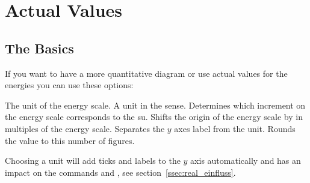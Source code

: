 \documentclass[load-preamble+]{cnltx-doc}
\begin{document}
\begin{example}
  \begin{endiagram}[y-label=above]
  \end{endiagram}
  \begin{endiagram}[y-label=above,x-label=right]
  \end{endiagram}
  \begin{endiagram}[axes=all,y-label=above]
  \end{endiagram}
\end{example}

\section{Actual Values}\label{sec:reale_werte}
\subsection{The Basics}

If you want to have a more quantitative diagram or use actual values for the
energies you can use these options:
\begin{options}
  \Default
    The unit of the energy scale.  A unit in the  sense.
    Determines which increment on the energy scale corresponds to the
    \ac{su}.
    Shifts the origin of the energy scale by  in multiples of the
    energy scale.
  \Default{/}
    Separates the $y$ axes label from the unit.
    Rounds the value to this number of figures.
\end{options}
Choosing a unit will add ticks and labels to the $y$ axis automatically and has
an impact on the commands  and , see
section~\ref{ssec:real_einfluss}.

\begin{example}
  \begin{endiagram}[ticks,y-label=above,energy-step=10]
  \end{endiagram}
  \begin{endiagram}[y-label=above,energy-step=10,energy-zero=30]
  \end{endiagram}
\end{example}
\end{document}
